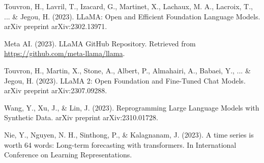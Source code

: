 \begin{thebibliography}{99}
	 Touvron, H., Lavril, T., Izacard, G., Martinet, X., Lachaux, M. A., Lacroix, T., ... \& Jegou, H. (2023). LLaMA: Open and Efficient Foundation Language Models. arXiv preprint arXiv:2302.13971.

	 Meta AI. (2023). LLaMA GitHub Repository. Retrieved from \url{https://github.com/meta-llama/llama}.

	 Touvron, H., Martin, X., Stone, A., Albert, P., Almahairi, A., Babaei, Y., ... \& Jegou, H. (2023). LLaMA 2: Open Foundation and Fine-Tuned Chat Models. arXiv preprint arXiv:2307.09288.

	 Wang, Y., Xu, J., \& Lin, J. (2023). Reprogramming Large Language Models with Synthetic Data. arXiv preprint arXiv:2310.01728.

	 Nie, Y., Nguyen, N. H., Sinthong, P., \& Kalagnanam, J. (2023). A time series is worth 64 words: Long-term forecasting with transformers. In International Conference on Learning Representations.

\end{thebibliography}
